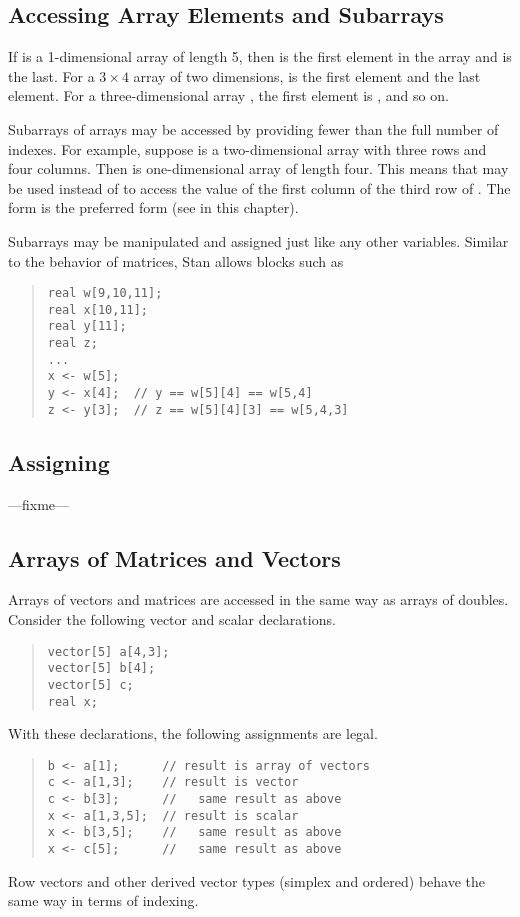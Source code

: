 \subsection{Accessing Array Elements and Subarrays}

If  is a 1-dimensional array of length 5, then  is
the first element in the array and  is the last.  For a $3
\times 4$ array  of two dimensions,  is the first
element and  the last element.  For a three-dimensional
array , the first element is , and so on.

Subarrays of arrays may be accessed by providing fewer than the full
number of indexes.  For example, suppose  is a two-dimensional
array with three rows and four columns.  Then  is
one-dimensional array of length four.  This means that 
may be used instead of  to access the value of the first
column of the third row of .  The form  is the
preferred form (see  in this chapter).

Subarrays may be manipulated and assigned just like any other
variables.  Similar to the behavior of matrices, Stan allows blocks
such as 
%
\begin{quote}
\begin{Verbatim} 
real w[9,10,11];
real x[10,11];
real y[11];
real z;
...
x <- w[5];
y <- x[4];  // y == w[5][4] == w[5,4]
z <- y[3];  // z == w[5][4][3] == w[5,4,3]
\end{Verbatim}
\end{quote}
%

\subsection{Assigning}

---fixme---

\subsection{Arrays of Matrices and Vectors}

Arrays of vectors and matrices are accessed in the same way as arrays
of doubles.  Consider the following vector and scalar declarations.
%
\begin{quote}
\begin{Verbatim}
vector[5] a[4,3];
vector[5] b[4];
vector[5] c;
real x;
\end{Verbatim}
\end{quote}
%
With these declarations, the following assignments are legal.
%
\begin{quote}
\begin{Verbatim}
b <- a[1];      // result is array of vectors
c <- a[1,3];    // result is vector
c <- b[3];      //   same result as above
x <- a[1,3,5];  // result is scalar
x <- b[3,5];    //   same result as above
x <- c[5];      //   same result as above
\end{Verbatim}
\end{quote}
%
Row vectors and other derived vector types (simplex and ordered)
behave the same way in terms of indexing.

